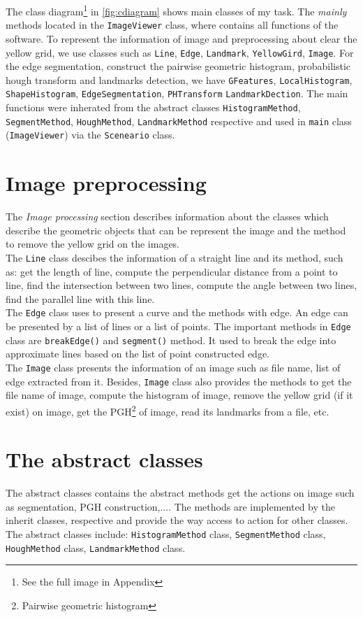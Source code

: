 The class diagram\footnote{See the full image in Appendix} in \ref{fig:cdiagram} shows main classes of my task. The \textit{mainly} methods located in the \texttt{ImageViewer} class, where contains all functions of the software. To represent the information of image and preprocessing about clear the yellow grid, we use classes such as \texttt{Line}, \texttt{Edge}, \texttt{Landmark}, \texttt{YellowGird}, \texttt{Image}. For the edge segmentation, construct the pairwise geometric histogram, probabilistic hough transform and landmarks detection, we have \texttt{GFeatures}, \texttt{LocalHistogram}, \texttt{ShapeHistogram}, \texttt{EdgeSegmentation}, \texttt{PHTransform} \texttt{LandmarkDection}. The main functions were inherated from the abstract classes \texttt{HistogramMethod}, \texttt{SegmentMethod}, \texttt{HoughMethod}, \texttt{LandmarkMethod} respective and used in \texttt{main} class (\texttt{ImageViewer}) via the \texttt{Sceneario} class. 
\section{Image preprocessing}
The \textit{Image processing} section describes information about the classes which describe the geometric objects that can be represent the image and the method to remove the yellow grid on the images.\\[0.2cm]
The \texttt{Line} class descibes the information of a straight line and its method, such as: get the length of line, compute the perpendicular distance from a point to line, find the intersection between two lines, compute the angle between two lines, find the parallel line with this line.\\[0.2cm]
The \texttt{Edge} class uses to present a curve and the methods with edge. An edge can be presented by a list of lines or a list of points. The important methods in \texttt{Edge} class are \texttt{breakEdge()} and \texttt{segment()} method. It used to break the edge into approximate lines based on the list of point constructed edge.\\[0.2cm]
The \texttt{Image} class presents the information of an image such as file name, list of edge extracted from it. Besides, \texttt{Image} class also provides the methods to get the file name of image, compute the histogram of image, remove the yellow grid (if it exist) on image, get the PGH\footnote{Pairwise geometric histogram} of image, read its landmarks from a file, etc. \\[0.2cm]
\section{The abstract classes}
The abstract classes contains the abstract methods get the actions on image such as segmentation, PGH construction,.... The methods are implemented by the inherit classes, respective and provide the way access to action for other classes. The abstract classes include: \texttt{HistogramMethod} class, \texttt{SegmentMethod} class, \texttt{HoughMethod} class, \texttt{LandmarkMethod} class.
